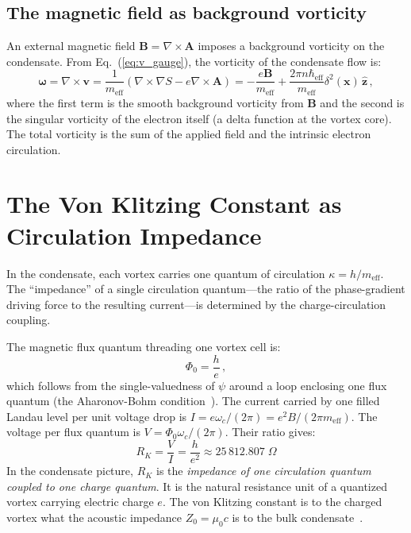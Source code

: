 \documentclass[12pt, a4paper]{article}
\newcommand{\meff}{m_{\mathrm{eff}}}
\newcommand{\heff}{\hbar_{\mathrm{eff}}}
\begin{document}
\subsection{The magnetic field as background vorticity}

An external magnetic field $\mathbf{B} = \nabla
\times\mathbf{A}$ imposes a background vorticity on
the condensate. From Eq.~(\ref{eq:v_gauge}), the
vorticity of the condensate flow is:
\begin{equation}
    \boldsymbol{\omega} = \nabla\times\mathbf{v}
    = \frac{1}{\meff}(\nabla\times\nabla S
    - e\nabla\times\mathbf{A})
    = -\frac{e\mathbf{B}}{\meff}
    + \frac{2\pi n\heff}{\meff}
    \delta^2(\mathbf{x})\,\hat{\mathbf{z}}\,,
\label{eq:vorticity}
\end{equation}
where the first term is the smooth background
vorticity from $\mathbf{B}$ and the second is the
singular vorticity of the electron itself (a delta
function at the vortex core). The total vorticity is
the sum of the applied field and the intrinsic
electron circulation.


\section{The Von Klitzing Constant as Circulation
Impedance}
\label{sec:RK}

In the condensate, each vortex carries one quantum
of circulation $\kappa = h/\meff$. The ``impedance''
of a single circulation quantum---the ratio of the
phase-gradient driving force to the resulting
current---is determined by the charge-circulation
coupling.

The magnetic flux quantum threading one vortex
cell is:
\begin{equation}
    \Phi_0 = \frac{h}{e}\,,
\label{eq:Phi0}
\end{equation}
which follows from the single-valuedness of $\psi$
around a loop enclosing one flux quantum
(the Aharonov-Bohm
condition~\cite{aharonov_1959}). The current
carried by one filled Landau level per unit voltage
drop is $I = e\omega_c/(2\pi) = e^2 B/(2\pi\meff)$.
The voltage per flux quantum is
$V = \Phi_0 \omega_c/(2\pi)$. Their ratio gives:
\begin{equation}
    \boxed{\;R_K = \frac{V}{I} = \frac{h}{e^2}
    \approx 25\,812.807\;\Omega\;}
\label{eq:RK}
\end{equation}
In the condensate picture, $R_K$ is the
\emph{impedance of one circulation quantum coupled
to one charge quantum}. It is the natural resistance
unit of a quantized vortex carrying electric charge
$e$. The von Klitzing constant is to the charged
vortex what the acoustic impedance $Z_0 = \mu_0 c$
is to the bulk condensate~\cite{kulangiev_impedance}.
\end{document}
